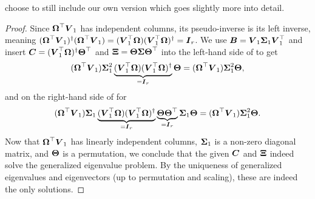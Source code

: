 choose to still include our own version which goes slightly more into detail.
\begin{proof}
    Since $\boldsymbol{\Omega}^{\top} \boldsymbol{V}_1$ has independent columns, its pseudo-inverse
    is its left inverse, meaning 
    $(\boldsymbol{\Omega}^{\top} \boldsymbol{V}_1)^{\dagger} (\boldsymbol{\Omega}^{\top} \boldsymbol{V}_1) = ( \boldsymbol{V}_1^{\top}\boldsymbol{\Omega}) ( \boldsymbol{V}_1^{\top}\boldsymbol{\Omega})^{\dagger} = \boldsymbol{I}_r$.
    We use $\boldsymbol{B} = \boldsymbol{V}_1 \boldsymbol{\Sigma}_1 \boldsymbol{V}_1^{\top}$ and insert
    $\boldsymbol{C} = (\boldsymbol{V}_1^{\top} \boldsymbol{\Omega})^{\dagger} \boldsymbol{\Theta}^{\top}$
    and $\boldsymbol{\Xi} = \boldsymbol{\Theta} \boldsymbol{\Sigma} \boldsymbol{\Theta}^{\top}$ into the
    left-hand side of  to get
    \begin{equation}
        (\boldsymbol{\Omega}^{\top} \boldsymbol{V}_1) \boldsymbol{\Sigma}_1^2 \underbrace{(\boldsymbol{V}_1^{\top} \boldsymbol{\Omega}) (\boldsymbol{V}_1^{\top} \boldsymbol{\Omega})^{\dagger}}_{=\boldsymbol{I}_r} \boldsymbol{\Theta} = (\boldsymbol{\Omega}^{\top} \boldsymbol{V}_1) \boldsymbol{\Sigma}_1^2 \boldsymbol{\Theta},
    \end{equation}
    and on the right-hand side of  for
    \begin{equation}
        (\boldsymbol{\Omega}^{\top} \boldsymbol{V}_1) \boldsymbol{\Sigma}_1 \underbrace{(\boldsymbol{V}_1^{\top} \boldsymbol{\Omega}) (\boldsymbol{V}_1^{\top} \boldsymbol{\Omega})^{\dagger}}_{=\boldsymbol{I}_r} \underbrace{\boldsymbol{\Theta} \boldsymbol{\Theta}^{\top}}_{=\boldsymbol{I}_r} \boldsymbol{\Sigma}_1 \boldsymbol{\Theta} = (\boldsymbol{\Omega}^{\top} \boldsymbol{V}_1) \boldsymbol{\Sigma}_1^2 \boldsymbol{\Theta}.
    \end{equation}
    Now that $\boldsymbol{\Omega}^{\top} \boldsymbol{V}_1$ has linearly independent columns, $\boldsymbol{\Sigma}_1$ is a non-zero
    diagonal matrix, and $\boldsymbol{\Theta}$ is a permutation, we conclude that
    the given $\boldsymbol{C}$ and $\boldsymbol{\Xi}$ indeed solve the generalized eigenvalue problem.
    By the uniqueness of generalized eigenvalues and eigenvectors (up to
    permutation and scaling), these are indeed the only solutions.


\end{proof}
